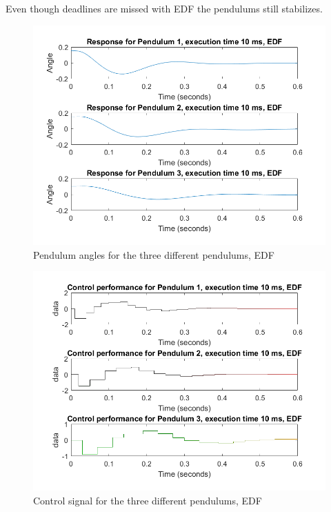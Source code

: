 \documentclass[12pt,a4paper]{article}
\begin{document}
\subsection{}
Even though deadlines are missed with EDF the pendulums still stabilizes. 
\begin{center}
	\begin{figure}[H]
      \centering
	\includegraphics[scale=0.5]{ex6531.png}
	\caption{Pendulum angles for the three different pendulums, EDF}
	\label{fig:ex61}
	\end{figure}
\end{center}
\begin{center}
	\begin{figure}[H]
      \centering
	\includegraphics[scale=0.5]{ex6532.png}
	\caption{Control signal  for the three different pendulums, EDF}
	\label{fig:ex62}
	\end{figure}
\end{center}
\end{document}

